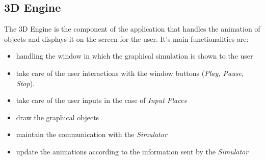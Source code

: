 \subsection{3D Engine}

The 3D Engine is the component of the application that handles the animation of objects and displays it on the screen for the user. It's main functionalities are: 

\begin{itemize}
\item handling the window in which the graphical simulation is shown to the user
\item take care of the user interactions with the window buttons (\textit{Play, Pause, Stop}).
\item take care of the user inputs in the case of \textit{Input Places}
\item draw the graphical objects
\item maintain the communication with the \textit{Simulator}
\item update the animations according to the information sent by the \textit{Simulator}
\end{itemize}

